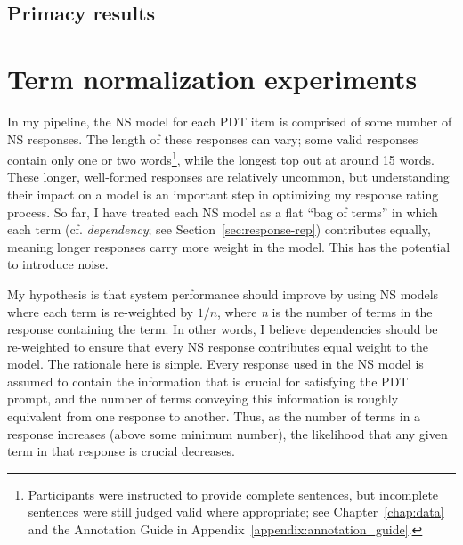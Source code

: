 \subsection{Primacy results}
\label{sec:primacy-results}

\section{Term normalization experiments}
\label{sec:exp-term-norm}

In my pipeline, the NS model for each PDT item is comprised of some number of NS responses. The length of these responses can vary; some valid responses contain only one or two words\footnote{Participants were instructed to provide complete sentences, but incomplete sentences were still judged valid where appropriate; see Chapter~\ref{chap:data} and the Annotation Guide in Appendix~\ref{appendix:annotation_guide}.}, while the longest top out at around 15 words. These longer, well-formed responses are relatively uncommon, but understanding their impact on a model is an important step in optimizing my response rating process. So far, I have treated each NS model as a flat ``bag of terms'' in which each term (cf. \textit{dependency}; see Section~\ref{sec:response-rep}) contributes equally, meaning longer responses carry more weight in the model. This has the potential to introduce noise. 

My hypothesis is that system performance should improve by using NS models where each term is re-weighted by $1/\textit{n}$, where \textit{n} is the number of terms in the response containing the term. In other words, I believe dependencies should be re-weighted to ensure that every NS response contributes equal weight to the model. The rationale here is simple. Every response used in the NS model is assumed to contain the information that is crucial for satisfying the PDT prompt, and the number of terms conveying this information is roughly equivalent from one response to another. Thus, as the number of terms in a response increases (above some minimum number), the likelihood that any given term in that response is crucial decreases.


